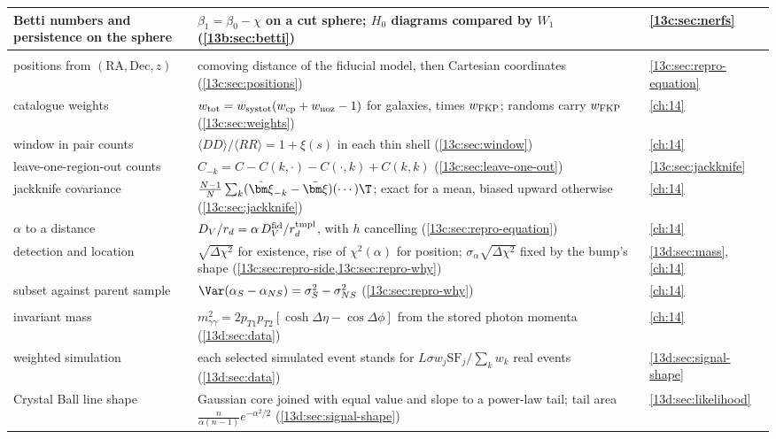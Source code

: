 \begin{xltabular}{\linewidth}{@{}>{\raggedright\arraybackslash}p{2.6cm}
  >{\raggedright\arraybackslash}X >{\raggedright\arraybackslash}p{2.5cm}@{}}
Betti numbers and persistence on the sphere & $\beta_1=\beta_0-\chi$ on a cut sphere; $H_0$ diagrams compared by $W_1$ (\cref{13b:sec:betti}) & \cref{13c:sec:nerfs}\\
\midrule
{}\\
positions from $(\mathrm{RA},\mathrm{Dec},z)$ & comoving distance of the fiducial model, then Cartesian coordinates (\cref{13c:sec:positions}) & \cref{13c:sec:repro-equation}\\
catalogue weights & $w_{\rm tot}=w_{\rm systot}(w_{\rm cp}+w_{\rm noz}-1)$ for galaxies, times $w_{\rm FKP}$; randoms carry $w_{\rm FKP}$ (\cref{13c:sec:weights}) & \cref{ch:14}\\
window in pair counts & $\langle DD\rangle/\langle RR\rangle=1+\xi(s)$ in each thin shell (\cref{13c:sec:window}) & \cref{ch:14}\\
leave-one-region-out counts & $C_{-k}=C-C(k,\cdot)-C(\cdot,k)+C(k,k)$ (\cref{13c:sec:leave-one-out}) & \cref{13c:sec:jackknife}\\
jackknife covariance & $\frac{N-1}{N}\sum_k(\hat{\bm\xi}_{-k}-\bar{\bm\xi})(\cdots)\T$; exact for a mean, biased upward otherwise (\cref{13c:sec:jackknife}) & \cref{ch:14}\\
$\alpha$ to a distance & $D_V/r_d=\alpha\,D_V^{\rm fid}/r_d^{\rm tmpl}$, with $h$ cancelling (\cref{13c:sec:repro-equation}) & \cref{ch:14}\\
detection and location & $\sqrt{\Delta\chi^2}$ for existence, rise of $\chi^2(\alpha)$ for position; $\sigma_\alpha\sqrt{\Delta\chi^2}$ fixed by the bump's shape (\cref{13c:sec:repro-side,13c:sec:repro-why}) & \cref{13d:sec:mass}, \cref{ch:14}\\
subset against parent sample & $\Var(\alpha_S-\alpha_{NS})=\sigma_S^2-\sigma_{NS}^2$ (\cref{13c:sec:repro-why}) & \cref{ch:14}\\
\midrule
{}\\
invariant mass & $m_{\gamma\gamma}^2=2p_{T1}p_{T2}[\cosh\Delta\eta-\cos\Delta\phi]$ from the stored photon momenta (\cref{13d:sec:data}) & \cref{ch:14}\\
weighted simulation & each selected simulated event stands for $L\sigma w_j\mathrm{SF}_j/\sum_kw_k$ real events (\cref{13d:sec:data}) & \cref{13d:sec:signal-shape}\\
Crystal Ball line shape & Gaussian core joined with equal value and slope to a power-law tail; tail area $\frac{n}{\alpha(n-1)}e^{-\alpha^2/2}$ (\cref{13d:sec:signal-shape}) & \cref{13d:sec:likelihood}\\

\end{xltabular}
